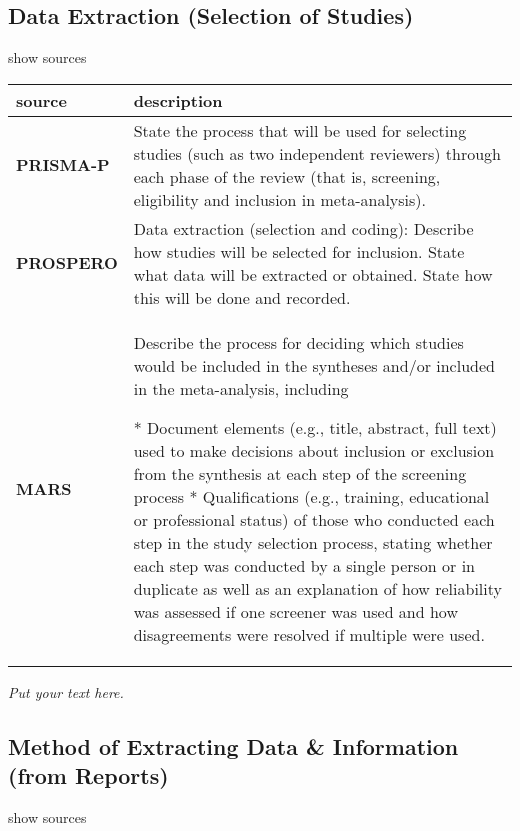 \documentclass[]{article}
\begin{document}
\hypertarget{data-extraction-selection-of-studies}{%
\subsection{Data Extraction (Selection of
Studies)}\label{data-extraction-selection-of-studies}}

show sources

\hypertarget{desos}{}
\begin{table}[H]
\centering
\begin{tabular}{>{\bfseries}l|l}
\hline
\rowcolor[HTML]{ececec}  source & description\\
\hline
PRISMA-P & State the process that will be used for selecting studies (such as two independent reviewers) through each phase of the review (that is, screening, eligibility and inclusion in meta-analysis).\\
\hline
PROSPERO & Data extraction (selection and coding): Describe how studies will be selected for inclusion. State what data will be extracted or obtained. State how this will be done and recorded.\\
\hline
MARS & Describe the process for deciding which studies would be included in the syntheses and/or included in the meta-analysis, including

* Document elements (e.g., title, abstract, full text) used to make decisions about inclusion or exclusion from the synthesis at each step of the screening process 
* Qualifications (e.g., training, educational or professional status) of those who conducted each step in the study selection process, stating whether each step was conducted by a single person or in duplicate as well as an explanation of how reliability was assessed if one screener was used and how disagreements were resolved if multiple were used.\\
\hline
\end{tabular}
\end{table}

\emph{Put your text here.}

\hypertarget{method-of-extracting-data-information-from-reports}{%
\subsection{Method of Extracting Data \& Information (from
Reports)}\label{method-of-extracting-data-information-from-reports}}

show sources
\end{document}
